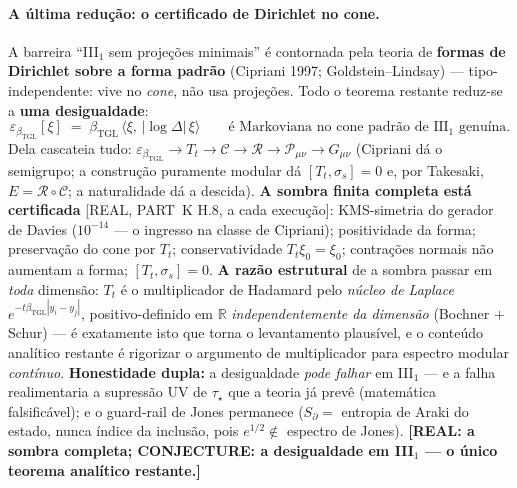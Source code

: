 \documentclass[12pt,a4paper]{article}
\newcommand{\betatgl}{\beta_{\text{TGL}}}
\begin{document}
\paragraph{A última redução: o certificado de Dirichlet no cone.}  A barreira ``III$_1$ sem projeções minimais'' é contornada pela teoria de \textbf{formas de Dirichlet sobre a forma padrão} (Cipriani 1997; Goldstein--Lindsay) --- tipo-independente: vive no \emph{cone}, não usa projeções.  Todo o teorema restante reduz-se a \textbf{uma desigualdade}:
\begin{equation}
\varepsilon_{\betatgl}[\xi] \;=\; \betatgl\,\langle\xi,\,|\log\Delta|\,\xi\rangle
\qquad\text{é Markoviana no cone padrão de III$_1$ genuína.}
\end{equation}
Dela cascateia tudo: $\varepsilon_{\betatgl} \to T_t \to \mathcal C \to \mathcal R \to \mathcal P_{\mu\nu} \to G_{\mu\nu}$ (Cipriani dá o semigrupo; a construção puramente modular dá $[T_t,\sigma_s]=0$ e, por Takesaki, $E=\mathcal R\circ\mathcal C$; a naturalidade dá a descida).  \textbf{A sombra finita completa está certificada} [REAL, PART~K H.8, a cada execução]: KMS-simetria do gerador de Davies ($10^{-14}$ --- o ingresso na classe de Cipriani); positividade da forma; preservação do cone por $T_t$; conservatividade $T_t\xi_0=\xi_0$; contrações normais não aumentam a forma; $[T_t,\sigma_s]=0$.  \textbf{A razão estrutural} de a sombra passar em \emph{toda} dimensão: $T_t$ é o multiplicador de Hadamard pelo \emph{núcleo de Laplace} $e^{-t\betatgl|y_i-y_j|}$, positivo-definido em $\mathbb R$ \emph{independentemente da dimensão} (Bochner $+$ Schur) --- é exatamente isto que torna o levantamento plausível, e o conteúdo analítico restante é rigorizar o argumento de multiplicador para espectro modular \emph{contínuo}.  \textbf{Honestidade dupla:} a desigualdade \emph{pode falhar} em III$_1$ --- e a falha realimentaria a supressão UV de $\tau_\star$ que a teoria já prevê (matemática falsificável); e o guard-rail de Jones permanece ($S_\partial = $ entropia de Araki do estado, nunca índice da inclusão, pois $e^{1/2}\notin$ espectro de Jones).  \textbf{[REAL: a sombra completa; CONJECTURE: a desigualdade em III$_1$ --- o único teorema analítico restante.]}
\end{document}
